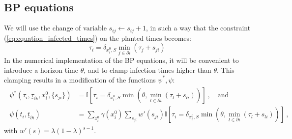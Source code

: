\documentclass[a4paper, amsfonts, amssymb, amsmath, reprint, showkeys, nofootinbib, twoside, floatfix, pre,superscriptaddress]{revtex4-2}
\begin{document}
\appendix
\begin{widetext}
\section{BP equations}
We will use the change of variable $s_{ij}\leftarrow s_{ij}+1$, in such a way that the constraint (\ref{eq:equation_infected_times}) on the planted times becomes:
$$
\tau_i =\delta_{x_i^0,S}\min_{j\in\partial i}(\tau_j+s_{ji}) \,
$$
In the numerical implementation of the BP equations, it will be convenient to introduce a horizon time $\theta$, and to clamp infection times higher than $\theta$.
This clamping results in a modification of the functions $\psi^*, \psi$:
\begin{align}
\begin{aligned}
	\psi^*(\tau_i,\underline{\tau}_{\partial i},x_i^0,\{s_{ji}\}) &= \mathbb{I}[\tau_i=\delta_{x_i^0,S}\min(\theta,\min_{l\in\partial i}(\tau_l+s_{li}))] \ , \quad \text{and}\\
	\psi(t_i,\underline{t}_{\partial i}) &=\sum_{x_i^0}\gamma(x_i^0)\sum_{s_{ji}}w'(s_{ji})\mathbb{I}[\tau_i=\delta_{x_i^0,S}\min(\theta,\min_{l\in\partial i}(\tau_l+s_{li}))] \ ,
\end{aligned}
\end{align}
with $w'(s)=\lambda(1-\lambda)^{s-1}$.


\end{widetext}
\end{document}
